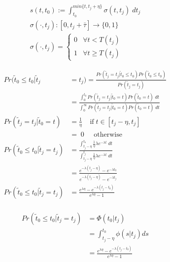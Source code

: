 \documentclass[14pt]{article}
\begin{document}

\begin{align}
s(t, t_0) := \int_{t_0}^{min\{t, t_j + \eta\}} \sigma(t, t_j) \; dt_j \\
\sigma( \cdot, t_j) : [0, t_j + \bar\tau] \rightarrow \{0, 1\} \\
\sigma(\cdot, t_j) =
\left\{
    \begin{array}{ll}
      0 & \forall t < T(t_j) \\
      1 & \forall t \ge T(t_j)
    \end{array}
\right.
\end{align}




\begin{align}
Pr(\tilde t_0 \le t_0 | \tilde t_j &= t_j) = \frac{Pr(\tilde t_j = t_j | \tilde t_0 \le t_0) Pr(\tilde t_0 \le t_0)}{Pr(\tilde t_j = t_j)} \\
&= \frac{
    \int_0^{t_0} Pr(\tilde t_j = t_j | \tilde t_0 = t) Pr(\tilde t_0 = t) \; dt
}
{\int_0^{\infty} Pr(\tilde t_j = t_j | \tilde t_0 = t) Pr(\tilde t_0 = t) \; dt} \\
Pr(\tilde t_j = t_j | \tilde t_0 = t)  &= \frac{1}{\eta} \; \;\;\; \text{if} \; t \in [t_j - \eta, t_j] \\
&= \; 0 \; \;\;\;\; \text{otherwise} \\
Pr(\tilde t_0 \le t_0 | \tilde t_j = t_j) &= \frac{\int_{t_j - \eta}^{t_o} \frac{1}{\eta} \lambda e^{-\lambda t} \; dt}{\int_{t_j - \eta}^{t_j} \frac{1}{\eta} \lambda e^{-\lambda t} \; dt} \\
   &= \frac{
e^{- \lambda (t_j - \eta)} - e^{- \lambda t_0 }
}{
e^{- \lambda (t_j - \eta)} - e^{- \lambda t_j }
} \\
Pr(\tilde t_0 \le t_0 | \tilde t_j = t_j) &=
\frac{
e^{\lambda\eta} - e^{- \lambda ( t_j - t_0) }
}{
e^{\lambda\eta} - 1
} \\
\end{align}

\begin{align}
Pr(\tilde t_0 \le t_0 | \tilde t_j = t_j) &= \Phi(t_0 | t_j) \\
&= \int_{t_j - \eta}^{t_0} \phi(s|t_j) ds \\
 &=
\frac{
e^{\lambda\eta} - e^{- \lambda ( t_j - t_0) }
}{
e^{\lambda\eta} - 1
}
\end{align}
\end{document}

